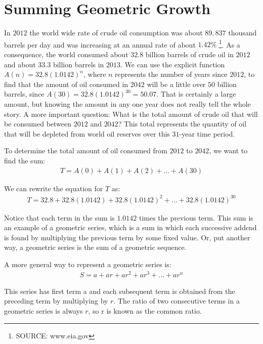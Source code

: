 \documentclass[10pt,]{book}
\theoremstyle{ptxdefinitionnotitle}
\theoremstyle{ptxdefinitiontitle}
\theoremstyle{ptxdefinitionnotitle}
\theoremstyle{ptxdefinitiontitle}
\theoremstyle{ptxdefinitionnotitle}
\theoremstyle{ptxdefinitiontitle}
\numberwithin{equation}{section}
\begin{document}
\section[{Summing Geometric Growth}]{Summing Geometric Growth}\label{chapter04-section04}
\hypertarget{p-137}{}%
In \(2012\) the world wide rate of crude oil consumption was about \(89,837\) thousand barrels per day and was increasing at an annual rate of about \(1.42\%\) \footnote{SOURCE: www.eia.gov\label{fn-1}}.  As a consequence, the world consumed about \(32.8\) billion barrels of crude oil in \(2012\) and about \(33.3\) billion barrels in \(2013\).  We can use the explicit function \(A(n)=32.8(1.0142)^n\), where \(n\) represents the number of years since \(2012\), to find that the amount of oil consumed in \(2042\) will be a little over \(50\) billion barrels, since \(A(30)=32.8(1.0142)^30 = 50.07\).  That is certainly a large amount, but knowing the amount in any one year does not really tell the whole story.  A more important question:  What is the total amount of crude oil that will be consumed between \(2012\) and \(2042\)?  This total represents the quantity of oil that will be depleted from world oil reserves over this \(31\)-year time period.%
\par
\hypertarget{p-138}{}%
To determine the total amount of oil consumed from \(2012\) to \(2042\), we want to find the sum:%
\begin{gather*}
T=A(0)+A(1)+A(2)+...+A(30)
\end{gather*}
%
\par
\hypertarget{p-139}{}%
We can rewrite the equation for \(T\) as:%
\begin{gather*}
T=32.8+32.8(1.0142)+32.8(1.0142)^2+...+32.8(1.0142)^{30}
\end{gather*}
%
\par
\hypertarget{p-140}{}%
Notice that each term in the sum is \(1.0142\) times the previous term. This sum is an example of a geometric series, which is a sum in which each successive addend is found by multiplying the previous term by some fixed value. Or, put another way, a geometric series is the sum of a geometric sequence.%
\par
\hypertarget{p-141}{}%
A more general way to represent a geometric series is:%
\begin{gather}
S = a + ar + ar^2 + ar^3 + ... + ar^n\label{chapter04-section04-geoseries-step1}
\end{gather}
%
\par
\hypertarget{p-142}{}%
This series has first term a and each subsequent term is obtained from the preceding term by multiplying by \(r\). The ratio of two consecutive terms in a geometric series is always \(r\), so r is known as the common ratio.%
\end{document}
